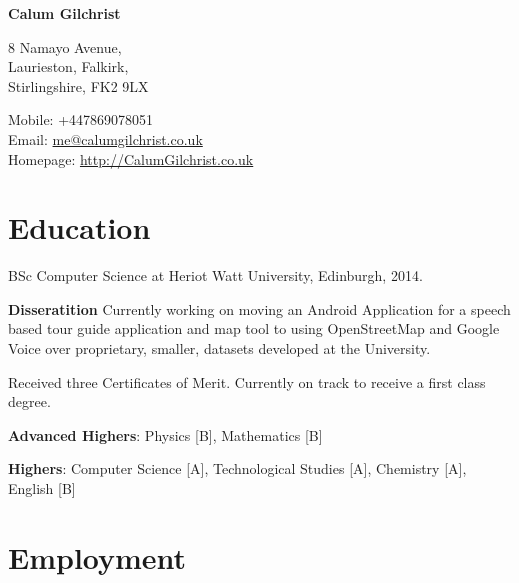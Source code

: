 \documentclass[11pt,a4paper]{article}
\def\name{Calum Gilchrist}
\renewenvironment{itemize}{
  \begin{list}{}{
    \setlength{\leftmargin}{1em}
    \setlength{\itemsep}{0.25em}
    \setlength{\parskip}{0pt}
    \setlength{\parsep}{0.25em}
    \renewcommand{\labelitemi}{$\bullet$}
  }
}{
  \end{list}
}
\begin{document}
%

\setlength{\parskip}{0em}


\centerline{\huge \bf \name}

\bigskip

\begin{minipage}[t]{0.495\textwidth}
  8 Namayo Avenue, \\
  Laurieston, Falkirk, \\
  Stirlingshire, FK2 9LX
\end{minipage}
\begin{minipage}[t]{0.495\textwidth}
  Mobile: +447869078051 \\
  Email: \href{mailto:me@calumgilchrist.co.uk}{me@calumgilchrist.co.uk} \\
  Homepage: \href{http://calumgilchrist.co.uk/}{http://CalumGilchrist.co.uk}
\end{minipage}

\section*{Education}

\begin{itemize}
    \item BSc Computer Science at Heriot Watt University, Edinburgh, 2014.

    \begin{itemize}
        \item \textbf{Disseratition} Currently working on moving an Android
            Application for a speech based tour guide application and map tool
            to using OpenStreetMap and Google Voice over proprietary, smaller,
            datasets developed at the University.
        \item Received three Certificates of Merit. Currently on track to
            receive a first class degree.
    \end{itemize}

    \item \textbf{Advanced Highers}: Physics [B], Mathematics [B]
    \item \textbf{Highers}: Computer Science [A], Technological Studies [A], Chemistry [A], English [B]
\end{itemize}

\section*{Employment}
\end{document}
